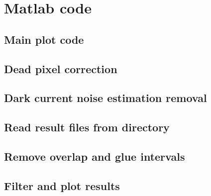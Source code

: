 \appendix %
\label{appendix:tabeller}

\clearpage

\clearpage

\section{Matlab code}

\subsection{Main plot code}


\subsection{Dead pixel correction}


\subsection{Dark current noise estimation removal}


\subsection{Read result files from directory}


\subsection{Remove overlap and glue intervals}


\subsection{Filter and plot results}
